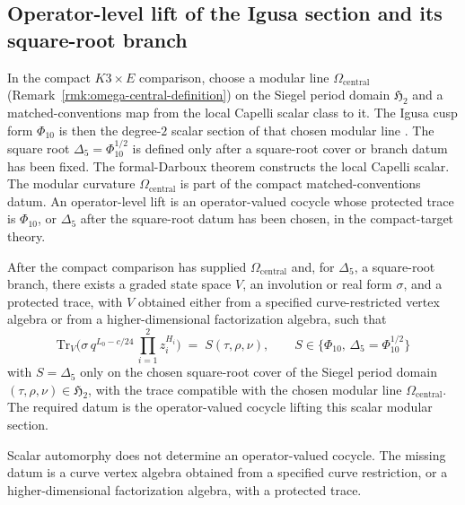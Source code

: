 \subsection{Operator-level lift of the Igusa section and its square-root branch}\label{app:hfc:operator-lift-modular}

In the compact \(K3\times E\) comparison, choose a modular line
\(\Omega_{\mathrm{central}}\)
(Remark~\ref{rmk:omega-central-definition}) on the Siegel period
domain \(\mathfrak H_2\)
and a matched-conventions map from the local Capelli scalar class to it.
The Igusa cusp form \(\Phi_{10}\) is then the degree-\(2\) scalar section
of that chosen modular line
\cite{igusa-cusp-form}\cite{gritsenko-nikulin-paramodular}.  The square
root \(\Delta_5=\Phi_{10}^{1/2}\) is defined only after a square-root
cover or branch datum has been fixed.  The formal-Darboux theorem
constructs the local Capelli scalar.  The modular curvature
\(\Omega_{\mathrm{central}}\) is part of the compact matched-conventions
datum.  An operator-level lift is an
operator-valued cocycle whose protected trace is \(\Phi_{10}\), or
\(\Delta_5\) after the square-root datum has been chosen, in the
compact-target theory.

\begin{conj}\label{app:conj:operator-lift-Delta5}
After the compact comparison has supplied
\(\Omega_{\mathrm{central}}\) and, for \(\Delta_5\), a square-root
branch, there exists a graded state space \(V\), an involution or
real form \(\sigma\), and a protected trace, with \(V\) obtained either
from a specified curve-restricted vertex algebra or from a
higher-dimensional factorization algebra, such that
\[
  \mathrm{Tr}_V\bigl(\sigma\,q^{L_0-c/24}\,
   \prod_{i=1}^{2}z_i^{H_i}\bigr)
   \;=\;S(\tau,\rho,\nu),
   \qquad
   S\in\{\Phi_{10},\,\Delta_5=\Phi_{10}^{1/2}\}
\]
with \(S=\Delta_5\) only on the chosen square-root cover of the Siegel
period domain \((\tau,\rho,\nu)\in\mathfrak H_2\), with the trace
compatible with the chosen modular line \(\Omega_{\mathrm{central}}\).
The required datum is the operator-valued cocycle lifting this scalar
modular section.
\end{conj}

Scalar automorphy does not determine an operator-valued cocycle.  The
missing datum is a curve vertex algebra obtained from a specified curve
restriction, or a higher-dimensional factorization algebra, with a
protected trace.

